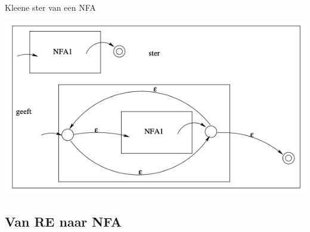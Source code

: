 \begin{pro}{Kleene ster van een NFA}
\begin{minipage}{.56\textwidth}
    \end{minipage}
    \begin{minipage}{.4\textwidth}
        \includegraphics[scale = 0.325]{Images/SterNFA}
    \end{minipage}
\end{pro}

\subsection{Van RE naar NFA}

\vspace{0.5cm}

